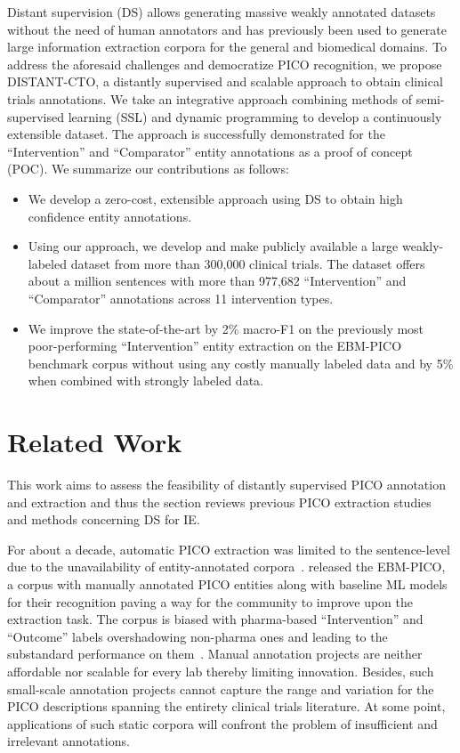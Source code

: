 \documentclass[letterpaper]{article} %
\begin{document}
Distant supervision (DS) allows generating massive weakly annotated datasets without the need of human annotators and has previously been used to generate large information extraction corpora for the general and biomedical domains.
To address the aforesaid challenges and democratize PICO recognition, we propose DISTANT-CTO, a distantly supervised and scalable approach to obtain clinical trials annotations.
We take an integrative approach combining methods of semi-supervised learning (SSL) and dynamic programming to develop a continuously extensible dataset.
The approach is successfully demonstrated for the ``Intervention'' and ``Comparator'' entity annotations as a proof of concept (POC).
We summarize our contributions as follows:
%
\begin{itemize}
    \item We develop a zero-cost, extensible approach using DS to obtain high confidence entity annotations.
    \item Using our approach, we develop and make publicly available a large weakly-labeled dataset from more than 300,000 clinical trials. The dataset offers about a million sentences with more than 977,682 ``Intervention'' and ``Comparator'' annotations across 11 intervention types.
    \item We improve the state-of-the-art by 2\% macro-F1 on the previously most poor-performing ``Intervention'' entity extraction on the EBM-PICO benchmark corpus without using any costly manually labeled data and by 5\% when combined with strongly labeled data.
\end{itemize}
%
\section{Related Work}
\label{sec:relworks}
%
This work aims to assess the feasibility of distantly supervised PICO annotation and extraction and thus the section reviews previous PICO extraction studies and methods concerning DS for IE.

For about a decade, automatic PICO extraction was limited to the sentence-level due to the unavailability of entity-annotated corpora~\citep{boudin2010combining, huang2011classification, huang2013pico, wallace2016extracting, jin2018pico}.
\citeauthor{nye2018corpus} released the EBM-PICO, a corpus with manually annotated PICO entities along with baseline ML models for their recognition paving a way for the community to improve upon the extraction task.
The corpus is biased with pharma-based ``Intervention'' and ``Outcome'' labels overshadowing non-pharma ones and leading to the substandard performance on them~\citep{nye2018corpus,beltagy2019scibert,brockmeier2019improving,zhang2020unlocking}.
Manual annotation projects are neither affordable nor scalable for every lab thereby limiting innovation.
Besides, such small-scale annotation projects cannot capture the range and variation for the PICO descriptions spanning the entirety clinical trials literature.
At some point, applications of such static corpora will confront the problem of insufficient and irrelevant annotations.
\end{document}
